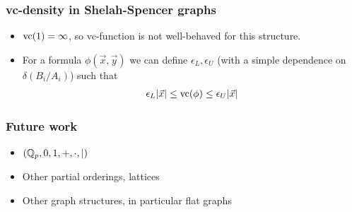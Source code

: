 \documentclass{beamer}
\begin{document}
\begin{frame}
	\frametitle{vc-density in Shelah-Spencer graphs}
	
	\begin{itemize}
		\item $\operatorname{vc}(1) = \infty$, so vc-function is not well-behaved for this structure.
		\item For a formula $\phi(\vec x, \vec y)$ we can define $\epsilon_L, \epsilon_U$ (with a simple dependence on $\delta(B_i/A_i)$) such that
			\begin{align*}
				\epsilon_L |\vec x| \leq \operatorname{vc}(\phi) \leq \epsilon_U |\vec x|
			\end{align*}
	\end{itemize}
\end{frame}

\begin{frame}
	\frametitle{Future work}
	\begin{itemize}
		\item $(\mathbb{Q}_p, 0, 1, +, \cdot, \mid)$
		\item Other partial orderings, lattices
		\item Other graph structures, in particular flat graphs
	\end{itemize}
\end{frame}
\end{document}
